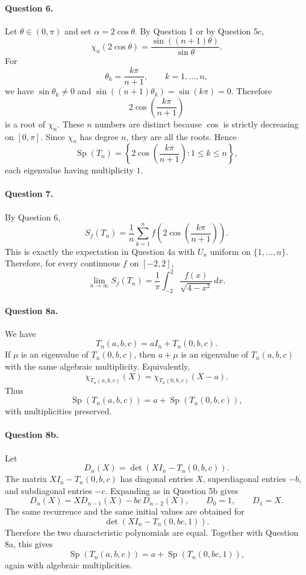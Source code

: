 \documentclass[11pt,a4paper]{article}
\DeclareMathOperator{\Sp}{Sp}
\begin{document}
\paragraph{Question 6.}
Let $\theta\in(0,\pi)$ and set $\alpha=2\cos\theta$.  By Question 1 or by Question 5c,
\[
  \chi_n(2\cos\theta)=\frac{\sin((n+1)\theta)}{\sin\theta}.
\]
For
\[
  \theta_k=\frac{k\pi}{n+1},\qquad k=1,\dots,n,
\]
we have $\sin\theta_k\ne0$ and $\sin((n+1)\theta_k)=\sin(k\pi)=0$.  Therefore
\[
  2\cos\left(\frac{k\pi}{n+1}\right)
\]
is a root of $\chi_n$.  These $n$ numbers are distinct because $\cos$ is strictly decreasing on $[0,\pi]$.  Since $\chi_n$ has degree $n$, they are all the roots.  Hence
\[
  \boxed{\Sp(T_n)=\left\{2\cos\left(\frac{k\pi}{n+1}\right):1\le k\le n\right\},}
\]
each eigenvalue having multiplicity $1$.

\paragraph{Question 7.}
By Question 6,
\[
  S_f(T_n)=\frac1n\sum_{k=1}^n
  f\left(2\cos\left(\frac{k\pi}{n+1}\right)\right).
\]
This is exactly the expectation in Question 4a with $U_n$ uniform on $\{1,\dots,n\}$.  Therefore, for every continuous $f$ on $[-2,2]$,
\[
  \boxed{
  \lim_{n\to\infty}S_f(T_n)
  =\frac1\pi\int_{-2}^2\frac{f(x)}{\sqrt{4-x^2}}\,dx.}
\]

\paragraph{Question 8a.}
We have
\[
  T_n(a,b,c)=aI_n+T_n(0,b,c).
\]
If $\mu$ is an eigenvalue of $T_n(0,b,c)$, then $a+\mu$ is an eigenvalue of $T_n(a,b,c)$ with the same algebraic multiplicity.  Equivalently,
\[
  \chi_{T_n(a,b,c)}(X)=\chi_{T_n(0,b,c)}(X-a).
\]
Thus
\[
  \boxed{\Sp(T_n(a,b,c))=a+\Sp(T_n(0,b,c)),}
\]
with multiplicities preserved.

\paragraph{Question 8b.}
Let
\[
  D_n(X)=\det(XI_n-T_n(0,b,c)).
\]
The matrix $XI_n-T_n(0,b,c)$ has diagonal entries $X$, superdiagonal entries $-b$, and subdiagonal entries $-c$.  Expanding as in Question 5b gives
\[
  D_n(X)=X D_{n-1}(X)-bc\,D_{n-2}(X),
  \qquad D_0=1,
  \qquad D_1=X.
\]
The same recurrence and the same initial values are obtained for
\[
  \det(XI_n-T_n(0,bc,1)).
\]
Therefore the two characteristic polynomials are equal.  Together with Question 8a, this gives
\[
  \boxed{\Sp(T_n(a,b,c))=a+\Sp(T_n(0,bc,1)),}
\]
again with algebraic multiplicities.
\end{document}
